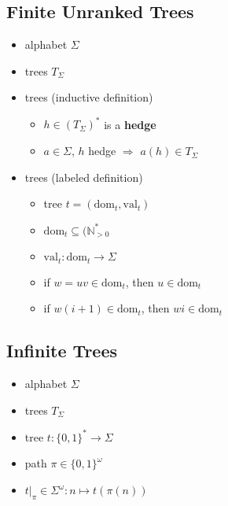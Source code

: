 \documentclass{article}
\begin{document}
\subsection{Finite Unranked Trees}
\begin{itemize}
	\item alphabet $\Sigma$
	\item trees $T_\Sigma$
	\item trees (inductive definition) 
		\begin{itemize}
			\item $h \in (T_\Sigma)^*$ is a \textbf{hedge}
			\item $a \in \Sigma$, $h$ hedge $\Rightarrow$ $a(h) \in T_\Sigma$
		\end{itemize}
	\item trees (labeled definition) 
		\begin{itemize}
			\item tree $t = (\text{dom}_t, \text{val}_t)$
			\item $\text{dom}_t \subseteq (\mathbb{N}_{> 0}^*$
			\item $\text{val}_t : \text{dom}_t \rightarrow \Sigma$
			\item if $w = uv \in \text{dom}_t$, then $u \in \text{dom}_t$
			\item if $w(i+1) \in \text{dom}_t$, then $wi \in \text{dom}_t$
		\end{itemize}
\end{itemize}

\subsection{Infinite Trees}
\begin{itemize}
	\item alphabet $\Sigma$
	\item trees $T_\Sigma$
	\item tree $t : \{0, 1\}^* \rightarrow \Sigma$
	\item path $\pi \in \{0, 1\}^\omega$
	\item $t|_\pi \in \Sigma^\omega : n \mapsto t(\pi(n))$
\end{itemize}
\end{document}
